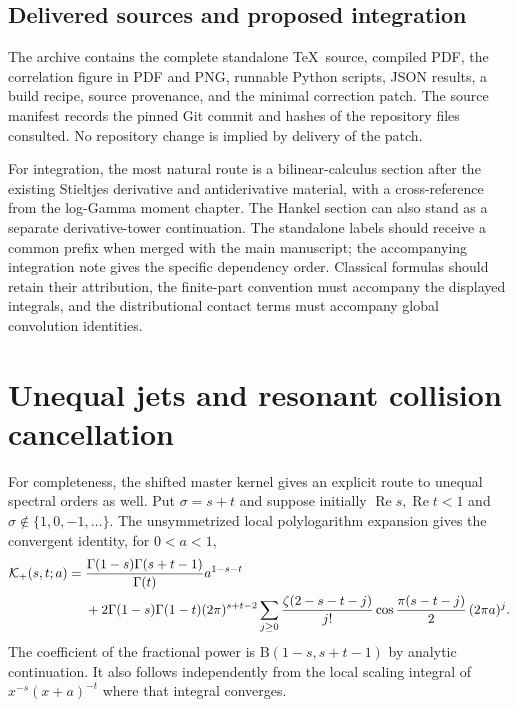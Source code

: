 \documentclass[11pt]{article}
\numberwithin{equation}{section}
\theoremstyle{definition}\newtheorem{definition}[theorem]{Definition}
\theoremstyle{remark}\newtheorem{remark}[theorem]{Remark}
\DeclareMathOperator{\Rea}{Re}
\newcommand{\calK}{\mathcal K}
\begin{document}
\subsection{Delivered sources and proposed integration}

The archive contains the complete standalone \TeX\ source, compiled
PDF, the correlation figure in PDF and PNG, runnable Python scripts,
JSON results, a build recipe, source provenance, and the minimal
correction patch. The source manifest records the pinned Git commit and
hashes of the repository files consulted. No repository change is
implied by delivery of the patch.

For integration, the most natural route is a bilinear-calculus section
after the existing Stieltjes derivative and antiderivative material,
with a cross-reference from the log-Gamma moment chapter. The Hankel
section can also stand as a separate derivative-tower continuation.
The standalone labels should receive a common prefix when merged with
the main manuscript; the accompanying integration note gives the
specific dependency order. Classical formulas should retain their
attribution, the finite-part convention must accompany the displayed
integrals, and the distributional contact terms must accompany global
convolution identities.

\appendix
\section{Unequal jets and resonant collision cancellation}
\label{app:resonance}

For completeness, the shifted master kernel gives an explicit route to
unequal spectral orders as well. Put $\sigma=s+t$ and suppose initially
$\Rea s,\Rea t<1$ and $\sigma\notin\{1,0,-1,\ldots\}$.
The unsymmetrized local polylogarithm expansion gives the convergent
identity, for $0<a<1$,
\begin{align}\label{eq:generalcollision}
 \calK_+(s,t;a)={}&
 \frac{\Gamma(1-s)\Gamma(s+t-1)}{\Gamma(t)}a^{1-s-t}\notag\\
 &+2\Gamma(1-s)\Gamma(1-t)(2\pi)^{s+t-2}
 \sum_{j\ge0}\frac{\zeta(2-s-t-j)}{j!}
       \cos\frac{\pi(s-t-j)}2\,(2\pi a)^j.
\end{align}
The coefficient of the fractional power is
$\mathrm B(1-s,s+t-1)$ by analytic continuation. It also follows
independently from the local scaling integral of
$x^{-s}(x+a)^{-t}$ where that integral converges.
\end{document}
